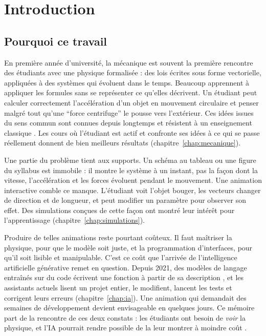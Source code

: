 
\chapter{Introduction}\label{chap:introduction}

\section{Pourquoi ce travail}

En première année d'université, la mécanique est souvent la première
rencontre des étudiants avec une physique formalisée : des lois écrites sous
forme vectorielle, appliquées à des systèmes qui évoluent dans le temps.
Beaucoup apprennent à appliquer les formules sans se représenter ce qu'elles
décrivent. Un étudiant peut calculer correctement l'accélération d'un objet
en mouvement circulaire et penser malgré tout qu'une \enquote{force
centrifuge} le pousse vers l'extérieur. Ces idées issues du sens commun sont
connues depuis longtemps et résistent à un enseignement classique
\cite{halloun1985common}. Les cours où l'étudiant est actif et confronte ses
idées à ce qui se passe réellement donnent de bien meilleurs résultats
\cite{hake1998} (chapitre~\ref{chap:mecanique}).

Une partie du problème tient aux supports. Un schéma au tableau ou une
figure du syllabus est immobile : il montre le système à un instant, pas la
façon dont la vitesse, l'accélération et les forces évoluent pendant le
mouvement. Une animation interactive comble ce manque. L'étudiant voit
l'objet bouger, les vecteurs changer de direction et de longueur, et peut
modifier un paramètre pour observer son effet. Des simulations conçues de
cette façon ont montré leur intérêt pour l'apprentissage
\cite{wieman2008phet, rutten2012} (chapitre~\ref{chap:simulations}).

Produire de telles animations reste pourtant coûteux. Il faut maîtriser la
physique, pour que le modèle soit juste, et la programmation d'interfaces,
pour qu'il soit lisible et manipulable. C'est ce coût que l'arrivée de
l'intelligence artificielle générative remet en question. Depuis 2021, des
modèles de langage entraînés sur du code écrivent une fonction à partir de
sa description \cite{chen2021codex}, et les assistants actuels lisent un
projet entier, le modifient, lancent les tests et corrigent leurs erreurs
(chapitre~\ref{chap:ia}). Une animation qui demandait des semaines de
développement devient envisageable en quelques jours. Ce mémoire part de la
rencontre de ces deux constats : les étudiants ont besoin de \emph{voir} la
physique, et l'IA pourrait rendre possible de la leur montrer à moindre coût
\cite{sujet_memoire}.

